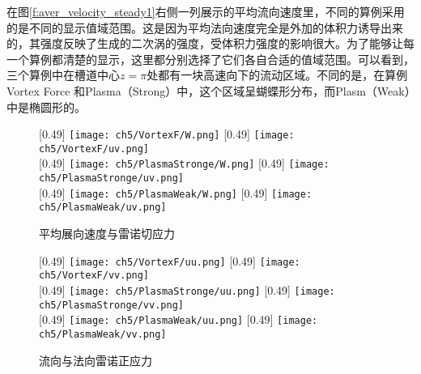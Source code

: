 在图\ref{f:aver_velocity_steady1}右侧一列展示的平均流向速度里，不同的算例采用的是不同的显示值域范围。这是因为平均法向速度完全是外加的体积力诱导出来的，其强度反映了生成的二次涡的强度，受体积力强度的影响很大。为了能够让每一个算例都清楚的显示，这里都分别选择了它们各自合适的值域范围。可以看到，三个算例中在槽道中心$z=\pi$处都有一块高速向下的流动区域。不同的是，在算例Vortex Force 和Plasma（Strong）中，这个区域呈蝴蝶形分布，而Plasm（Weak）中是椭圆形的。
\begin{figure}[htb]
  \centering
  [0.49\textwidth]
    {\texttt{[image: ch5/VortexF/W.png]}}
  [0.49\textwidth]
    {\texttt{[image: ch5/VortexF/uv.png]}}
  \\\bigskip
  [0.49\textwidth]
    {\texttt{[image: ch5/PlasmaStronge/W.png]}}
  [0.49\textwidth]
    {\texttt{[image: ch5/PlasmaStronge/uv.png]}}
  \\\bigskip
  [0.49\textwidth]
    {\texttt{[image: ch5/PlasmaWeak/W.png]}}
  [0.49\textwidth]
    {\texttt{[image: ch5/PlasmaWeak/uv.png]}}
  \caption{平均展向速度与雷诺切应力}\label{f:aver_velocity_steady2}
\end{figure}
\begin{figure}[htb]
  \centering
  [0.49\textwidth]
    {\texttt{[image: ch5/VortexF/uu.png]}}
  [0.49\textwidth]
    {\texttt{[image: ch5/VortexF/vv.png]}}
  \\\bigskip
  [0.49\textwidth]
    {\texttt{[image: ch5/PlasmaStronge/uu.png]}}
  [0.49\textwidth]
    {\texttt{[image: ch5/PlasmaStronge/vv.png]}}
  \\\bigskip
  [0.49\textwidth]
    {\texttt{[image: ch5/PlasmaWeak/uu.png]}}
  [0.49\textwidth]
    {\texttt{[image: ch5/PlasmaWeak/vv.png]}}
  \caption{流向与法向雷诺正应力}\label{f:aver_velocity_steady3}
\end{figure}

